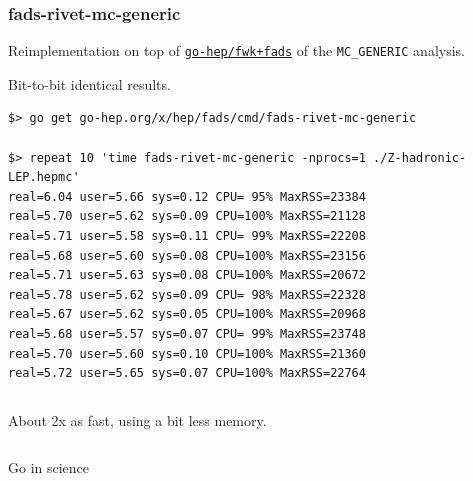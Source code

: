 \documentclass[9pt]{beamer}
\newcommand{\myblue} [1] {{\color{blue}#1}}
\begin{document}
\begin{frame}[fragile]
\frametitle{fads-rivet-mc-generic}


Reimplementation on top of \myblue{\href{https://godoc.org/go-hep.org/x/hep/fwk}{\texttt{go-hep/fwk+fads}}} of the \texttt{MC\_GENERIC} analysis.


Bit-to-bit identical results.


	\begin{block}{}

\begin{verbatim}
$> go get go-hep.org/x/hep/fads/cmd/fads-rivet-mc-generic

$> repeat 10 'time fads-rivet-mc-generic -nprocs=1 ./Z-hadronic-LEP.hepmc'
real=6.04 user=5.66 sys=0.12 CPU= 95% MaxRSS=23384
real=5.70 user=5.62 sys=0.09 CPU=100% MaxRSS=21128
real=5.71 user=5.58 sys=0.11 CPU= 99% MaxRSS=22208
real=5.68 user=5.60 sys=0.08 CPU=100% MaxRSS=23156
real=5.71 user=5.63 sys=0.08 CPU=100% MaxRSS=20672
real=5.78 user=5.62 sys=0.09 CPU= 98% MaxRSS=22328
real=5.67 user=5.62 sys=0.05 CPU=100% MaxRSS=20968
real=5.68 user=5.57 sys=0.07 CPU= 99% MaxRSS=23748
real=5.70 user=5.60 sys=0.10 CPU=100% MaxRSS=21360
real=5.72 user=5.65 sys=0.07 CPU=100% MaxRSS=22764
\end{verbatim}
	\end{block}{}

	\begin{exampleblock}{}
		\begin{columns}
			\begin{column}{0.70\textwidth}
About 2x as fast, using a bit less memory.
			\end{column}
		\end{columns}
	\end{exampleblock}{}
\end{frame}


\begin{frame}[fragile]
	\begin{columns}
		\begin{column}{0.70\textwidth}
			\begin{block}{}
				\begin{center}
Go in science
				\end{center}
			\end{block}
		\end{column}
	\end{columns}


\end{frame}
\end{document}
